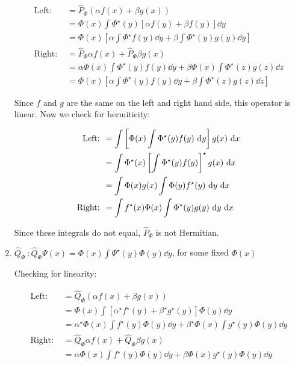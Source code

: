 \documentclass{article}
\begin{document}
\begin{enumerate}[label=(\alph*)]
\begin{solution}
        \begin{align*}
            \text{Left: } &= \hat P_\Phi (\alpha f(x) + \beta g(x)) \\
            &= \Phi(x) \int \Phi^\star(y)[\alpha f(y) + \beta f(y)] \dd y\\
            &= \Phi(x) \left[\alpha \int \Phi^\star f(y) \dd y + \beta \int \Phi^\star(y) g(y) \dd y\right]\\
            \text{Right: } &= \hat P_\Phi \alpha f(x) + \hat P_\Phi \beta g(x)\\
            &= \alpha \Phi(x) \int \Phi^\star(y) f(y) \dd y + \beta \Phi(x) \int \Phi^\star(z)g(z) \dd z\\
            &= \Phi(x) \left[\alpha \int \Phi^\star(y)f(y) \dd y + \beta \int \Phi^\star(z)g(z) \dd z\right]
        \end{align*}

        Since $f$ and $g$ are the same on the left and right hand side, this operator is linear. Now we check for hermiticity:

        \begin{align*}
            \text{Left: } &= \int \left[ \Phi(x) \int \Phi^\star(y) f(y) \ \mathrm d y\right] g(x) \ \mathrm d x\\
            &= \int \Phi^\star(x) \left[\int \Phi^\star(y) f(y)\right]^\star g(x) \ \mathrm d x\\
            &= \int \Phi(x) g(x) \int \Phi(y) f^\star(y) \ \mathrm d y \ \mathrm d x\\
            \text{Right: } &= \int f^\star(x) \Phi(x) \int \Phi^\star(y) g(y) \ \mathrm d y \ \mathrm d x
        \end{align*}

        Since these integrals do not equal, $\hat P_{\Phi}$ is not Hermitian.

    \end{solution}
    \item $\hat Q_\Phi \ : \hat Q_\Phi \Psi(x) = \Phi(x) \int \Psi^\star(y) \Phi(y) \dd y$, for some fixed $\Phi(x)$
    
    \begin{solution}
        Checking for linearity:

        \begin{align*}
            \text{Left: }&= \hat Q_\Phi \left(\alpha f(x) + \beta g(x)\right)\\
            &= \Phi(x) \int \left[\alpha^\star f^\star(y) + \beta^\star g^\star(y)\right] \Phi(y) \dd y\\
            &= \alpha^\star \Phi(x) \int f^\star(y) \Phi(y) \dd y + \beta^\star \Phi(x) \int g^\star(y) \Phi(y) \dd y\\
            \text{Right: } &= \hat Q_\Phi \alpha f(x) + \hat Q_\Phi \beta g(x)\\
            &= \alpha \Phi(x) \int f^\star(y) \Phi(y) \dd y + \beta \Phi(x) g^\star(y)\Phi(y) \dd y
        \end{align*}


\end{solution}
\end{enumerate}
\end{document}

